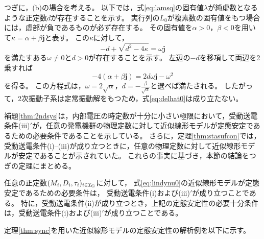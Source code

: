 \documentclass[tombow,dvipdfmx]{corona-a5-1.1}
\begin{document}
\begin{証明}
つぎに，(b)の場合を考える。
以下では，式\ref{eq:lamsq}の固有値$\lambda$が純虚数となるような正定数$d$が存在することを示す。
実行列の$L_0$が複素数の固有値をもつ場合には，虚部が負であるものが必ず存在する。
その固有値を$\alpha>0$，$\beta < 0$を用いて$\kappa = \alpha + \beta \bm{j}$と表す。
この$\kappa$に対して，
\[
-d + \sqrt{d^2-4\kappa}  = \omega \bm{j}
\]
を満たすある$\omega\neq 0$と$d>0$が存在することを示す。
左辺の$-d$を移項して両辺を2乗すれば
\[
-4 (\alpha + \beta \bm{j}) = 2d \omega \bm{j} -\omega^2
\]
を得る。
この方程式は，$\omega = 2\sqrt{\alpha}$，$d=-\frac{\beta}{\sqrt{\alpha}}$と選べば満たされる。
したがって，2次振動子系は定常振動解をもつため，式\ref{eq:delhat0}は成り立たない。
\end{証明}


補題\ref{thm:2ndsys}は，内部電圧の時定数が十分に小さい極限において，受動送電条件(iii)$'$が，任意の発電機群の物理定数に対して近似線形モデルが定態安定であるための必要条件であることを示している。
さらに，定理\ref{thm:stasufcon}では，受動送電条件(i)--(iii)が成り立つときに，任意の物理定数に対して近似線形モデルが安定であることが示されていた。
これらの事実に基づき，本節の結論をつぎの定理にまとめる。


\begin{定理}[近似線形モデルの定態安定性]\label{thm:sync}
任意の正定数$(M_i,D_i,\tau_i)_{i \in \mathcal{I}_{\rm G}}$に対して，
式\ref{eq:lindynu0}の近似線形モデルが定態安定であるための必要条件は，
受動送電条件(i)および(iii)$'$が成り立つことである。
特に，受動送電条件(ii)が成り立つとき，上記の定態安定性の必要十分条件は，受動送電条件(i)および(iii)$'$が成り立つことである。
\end{定理}


定理\ref{thm:sync}を用いた近似線形モデルの定態安定性の解析例を以下に示す。
\end{document}
